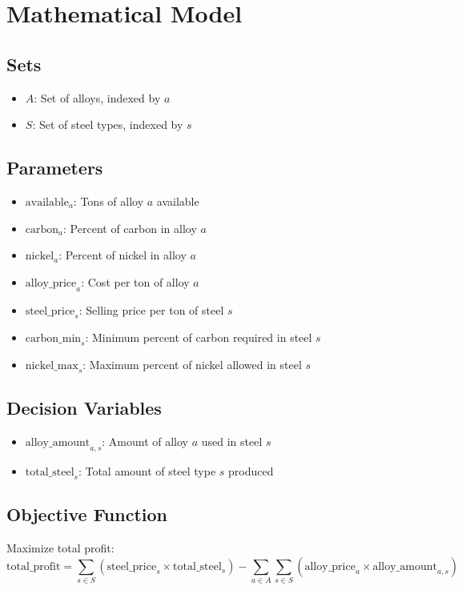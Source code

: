 \documentclass{article}
\begin{document}
\section*{Mathematical Model}

\subsection*{Sets}
\begin{itemize}
    \item \( A \): Set of alloys, indexed by \( a \)
    \item \( S \): Set of steel types, indexed by \( s \)
\end{itemize}

\subsection*{Parameters}
\begin{itemize}
    \item \( \text{available}_{a} \): Tons of alloy \( a \) available
    \item \( \text{carbon}_{a} \): Percent of carbon in alloy \( a \)
    \item \( \text{nickel}_{a} \): Percent of nickel in alloy \( a \)
    \item \( \text{alloy\_price}_{a} \): Cost per ton of alloy \( a \)
    \item \( \text{steel\_price}_{s} \): Selling price per ton of steel \( s \)
    \item \( \text{carbon\_min}_{s} \): Minimum percent of carbon required in steel \( s \)
    \item \( \text{nickel\_max}_{s} \): Maximum percent of nickel allowed in steel \( s \)
\end{itemize}

\subsection*{Decision Variables}
\begin{itemize}
    \item \( \text{alloy\_amount}_{a,s} \): Amount of alloy \( a \) used in steel \( s \)
    \item \( \text{total\_steel}_{s} \): Total amount of steel type \( s \) produced
\end{itemize}

\subsection*{Objective Function}
Maximize total profit:
\[
\text{total\_profit} = \sum_{s \in S} \left( \text{steel\_price}_{s} \times \text{total\_steel}_{s} \right) - \sum_{a \in A} \sum_{s \in S} \left( \text{alloy\_price}_{a} \times \text{alloy\_amount}_{a,s} \right)
\]
\end{document}
